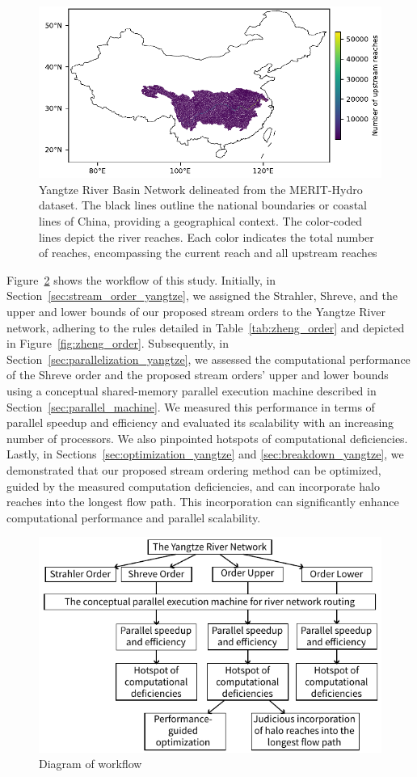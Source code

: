 \documentclass[water,article,submit,pdftex,moreauthors]{Definitions/mdpi}
\begin{document}
\begin{figure}[H]
    \includegraphics[width=14 cm]{fig/domain.pdf}
    \caption{Yangtze River Basin Network delineated from the MERIT-Hydro dataset. The black lines outline the national boundaries or coastal lines of China, providing a geographical context. The color-coded lines depict the river reaches. Each color indicates the total number of reaches, encompassing the current reach and all upstream reaches \label{fig:domain}}
\end{figure}

Figure~\ref{fig:workflow} shows the workflow of this study. Initially, in Section~\ref{sec:stream_order_yangtze}, we assigned the Strahler, Shreve, and the upper and lower bounds of our proposed stream orders to the Yangtze River network, adhering to the rules detailed in Table~\ref{tab:zheng_order} and depicted in Figure~\ref{fig:zheng_order}. Subsequently, in Section~\ref{sec:parallelization_yangtze}, we assessed the computational performance of the Shreve order and the proposed stream orders' upper and lower bounds using a conceptual shared-memory parallel execution machine described in Section~\ref{sec:parallel_machine}. We measured this performance in terms of parallel speedup and efficiency and evaluated its scalability with an increasing number of processors. We also pinpointed hotspots of computational deficiencies. Lastly, in Sections~\ref{sec:optimization_yangtze} and \ref{sec:breakdown_yangtze}, we demonstrated that our proposed stream ordering method can be optimized, guided by the measured computation deficiencies, and can incorporate halo reaches into the longest flow path. This incorporation can significantly enhance computational performance and parallel scalability.

\begin{figure}[H]
    \includegraphics[width=10.5 cm]{fig/workflow.pdf}
    \caption{Diagram of workflow \label{fig:workflow}}
\end{figure}
\end{document}
